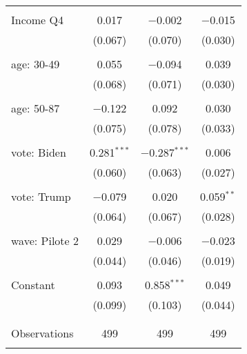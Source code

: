 \begin{tabular}{@{\extracolsep{5pt}}lccc}
  & & & \\ 
 Income Q4 & 0.017 & $-$0.002 & $-$0.015 \\ 
  & (0.067) & (0.070) & (0.030) \\ 
  & & & \\ 
 age: 30-49 & 0.055 & $-$0.094 & 0.039 \\ 
  & (0.068) & (0.071) & (0.030) \\ 
  & & & \\ 
 age: 50-87 & $-$0.122 & 0.092 & 0.030 \\ 
  & (0.075) & (0.078) & (0.033) \\ 
  & & & \\ 
 vote: Biden & 0.281$^{***}$ & $-$0.287$^{***}$ & 0.006 \\ 
  & (0.060) & (0.063) & (0.027) \\ 
  & & & \\ 
 vote: Trump & $-$0.079 & 0.020 & 0.059$^{**}$ \\ 
  & (0.064) & (0.067) & (0.028) \\ 
  & & & \\ 
 wave: Pilote 2 & 0.029 & $-$0.006 & $-$0.023 \\ 
  & (0.044) & (0.046) & (0.019) \\ 
  & & & \\ 
 Constant & 0.093 & 0.858$^{***}$ & 0.049 \\ 
  & (0.099) & (0.103) & (0.044) \\ 
  & & & \\ 
\hline \\[-1.8ex] 

Observations & 499 & 499 & 499 \\ 
\hline 
\hline \\[-1.8ex] 
\end{tabular} 